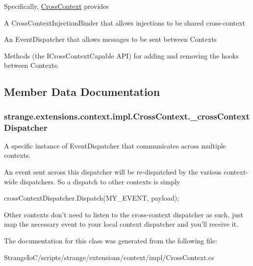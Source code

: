 Specifically, \hyperlink{classstrange_1_1extensions_1_1context_1_1impl_1_1_cross_context}{Cross\-Context} provides
\begin{DoxyItemize}
\item A Cross\-Context\-Injection\-Binder that allows injections to be shared cross-\/context
\item An Event\-Dispatcher that allows messages to be sent between Contexts
\item Methods (the I\-Cross\-Context\-Capable A\-P\-I) for adding and removing the hooks between Contexts. 
\end{DoxyItemize}

\subsection{Member Data Documentation}
\hypertarget{classstrange_1_1extensions_1_1context_1_1impl_1_1_cross_context_a00c68512ad80d15236954614f223820e}{
\subsubsection[{\-\_\-cross\-Context\-Dispatcher}]{ strange.\-extensions.\-context.\-impl.\-Cross\-Context.\-\_\-cross\-Context\-Dispatcher\hspace{0.3cm}{\ttfamily [protected]}}}\label{classstrange_1_1extensions_1_1context_1_1impl_1_1_cross_context_a00c68512ad80d15236954614f223820e}


A specific instance of Event\-Dispatcher that communicates across multiple contexts. 

An event sent across this dispatcher will be re-\/dispatched by the various context-\/wide dispatchers. So a dispatch to other contexts is simply

{\ttfamily cross\-Context\-Dispatcher.\-Dispatch(\-M\-Y\-\_\-\-E\-V\-E\-N\-T, payload)};

Other contexts don't need to listen to the cross-\/context dispatcher as such, just map the necessary event to your local context dispatcher and you'll receive it. 

The documentation for this class was generated from the following file\-:\begin{DoxyCompactItemize}
\item 
Strange\-Io\-C/scripts/strange/extensions/context/impl/Cross\-Context.\-cs\end{DoxyCompactItemize}
